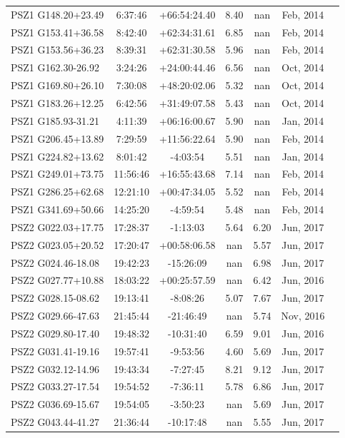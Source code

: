 \documentclass[apj, revtex4]{emulateapj}
\begin{document}
\begin{longtable*}{lcccccc}
PSZ1 G148.20+23.49 & 6:37:46 & +66:54:24.40 & 8.40 & nan & Feb, 2014\\
PSZ1 G153.41+36.58 & 8:42:40 & +62:34:31.61 & 6.85 & nan & Feb, 2014\\
PSZ1 G153.56+36.23 & 8:39:31 & +62:31:30.58 & 5.96 & nan & Feb, 2014\\
PSZ1 G162.30-26.92 & 3:24:26 & +24:00:44.46 & 6.56 & nan & Oct, 2014\\
PSZ1 G169.80+26.10 & 7:30:08 & +48:20:02.06 & 5.32 & nan & Oct, 2014\\
PSZ1 G183.26+12.25 & 6:42:56 & +31:49:07.58 & 5.43 & nan & Oct, 2014\\
PSZ1 G185.93-31.21 & 4:11:39 & +06:16:00.67 & 5.90 & nan & Jan, 2014\\
PSZ1 G206.45+13.89 & 7:29:59 & +11:56:22.64 & 5.90 & nan & Feb, 2014\\
PSZ1 G224.82+13.62 & 8:01:42 & -4:03:54 & 5.51 & nan & Jan, 2014\\
PSZ1 G249.01+73.75 & 11:56:46 & +16:55:43.68 & 7.14 & nan & Feb, 2014\\
PSZ1 G286.25+62.68 & 12:21:10 & +00:47:34.05 & 5.52 & nan & Feb, 2014\\
PSZ1 G341.69+50.66 & 14:25:20 & -4:59:54 & 5.48 & nan & Feb, 2014\\
PSZ2 G022.03+17.75 & 17:28:37 & -1:13:03 & 5.64 & 6.20 & Jun, 2017\\
PSZ2 G023.05+20.52 & 17:20:47 & +00:58:06.58 & nan & 5.57 & Jun, 2017\\
PSZ2 G024.46-18.08 & 19:42:23 & -15:26:09 & nan & 6.98 & Jun, 2017\\
PSZ2 G027.77+10.88 & 18:03:22 & +00:25:57.59 & nan & 6.42 & Jun, 2016\\
PSZ2 G028.15-08.62 & 19:13:41 & -8:08:26 & 5.07 & 7.67 & Jun, 2017\\
PSZ2 G029.66-47.63 & 21:45:44 & -21:46:49 & nan & 5.74 & Nov, 2016\\
PSZ2 G029.80-17.40 & 19:48:32 & -10:31:40 & 6.59 & 9.01 & Jun, 2016\\
PSZ2 G031.41-19.16 & 19:57:41 & -9:53:56 & 4.60 & 5.69 & Jun, 2017\\
PSZ2 G032.12-14.96 & 19:43:34 & -7:27:45 & 8.21 & 9.12 & Jun, 2017\\
PSZ2 G033.27-17.54 & 19:54:52 & -7:36:11 & 5.78 & 6.86 & Jun, 2017\\
PSZ2 G036.69-15.67 & 19:54:05 & -3:50:23 & nan & 5.69 & Jun, 2017\\
PSZ2 G043.44-41.27 & 21:36:44 & -10:17:48 & nan & 5.55 & Jun, 2017\\

\end{longtable*}
\end{document}
